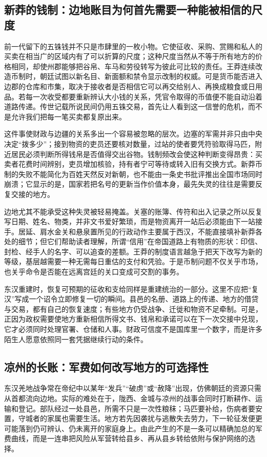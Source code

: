 \subsection{新莽的钱制：边地账目为何首先需要一种能被相信的尺度}

前一代留下的五铢钱并不只是市肆里的一枚小物。它使征收、采购、赏赐和私人的买卖在相当广的区域内有了可以折算的尺度；这种尺度当然从不等于所有地方的价格相同，却使州郡能够把谷帛、车马和劳役转写为彼此可比较的责任。王莽连续改造币制时，朝廷试图以新名目、新面额和禁令显示改制的权威。可是货币能否进入边郡的仓库和市集，取决于接收者是否相信它可以再交给别人、再换成粮食或日用品。若每一次收受都要重新辨认大小钱的关系，凭官令取得的币值便不能自动沿着道路传递。传世记载所说民间仍用五铢交易，首先让人看到这一信誉的危机，而不是允许我们把每一笔买卖都复原出来。

这件事使财政与边疆的关系多出一个容易被忽略的层次。边塞的军需并非只由中央决定“拨多少”；接到物资的吏员还要核对数量，过站的使者要凭符验取得马匹，附近居民必须判断所得钱帛是否值得交出谷物。钱制频改会使这种判断变得昂贵：买卖者花费时间辨别，吏员增加核验，持有者宁可等待或转入旧有交换方式。新莽币制的失败不能简化为百姓天然反对新朝，也不能由一条史书批评推出全国市场同时崩溃；它显示的是，国家若把名号的更新当作价值本身，最先失灵的往往是需要反复交接的地方。

边地尤其不能承受这种失灵被轻易掩盖。关塞的账簿、传符和出入记录之所以反复写日期、姓名、物类，并非文书爱好繁琐，而是物资离开一站后必须能由下一站接手。居延、肩水金关和悬泉置所见的行政动作主要属于西汉，不能直接填补新莽各处的细节；但它们帮助读者理解，所谓“信用”在帝国道路上有物质的形状：印信、封检、经手人的名字、可以追查的差额。王莽的制度语言越急于把天下改写为新的等级，基层越需要一种无需每日重估的支付和凭验。于是币制问题不仅关乎市场，也关乎命令是否能在远离宫廷的关口变成可交割的事务。

东汉重建时，恢复可预期的征收和支给同样是重建统治的一部分。这里不应把“复汉”写成一个诏令立即修复一切的瞬间。县邑的名册、道路上的传递、地方的借贷与交易，都有自己的恢复速度；有些地方仍受战争、迁徙和物资不足牵制。可是，正因为政权需要使地方重新相信所得文书、钱帛和承诺可以在下一次交接中兑现，它才必须同时处理官署、仓储和人事。财政可信度不是国库里一个数字，而是许多陌生人愿意依照同一套凭据继续行动的条件。

\subsection{凉州的长账：军费如何改写地方的可选择性}

东汉羌地战争常在帝纪中以某年“发兵”“破虏”或“赦降”出现，仿佛朝廷的资源只需从首都流向边地。实际的难处在于，陇西、金城与凉州的战事会同时打断耕作、运输和登记。部队经过一处县邑，所需不只是一次性粮秣；马匹要补给，伤病者要安置，守城者的家属也需要生活。地方若先因袭扰与逃散失去劳力，下一轮征发便更可能落到仍可辨认、仍未离开的家庭身上。由此产生的不是一条可以精确加总的军费曲线，而是一连串把风险从军营转给县乡、再从县乡转给依附与保护网络的选择。


